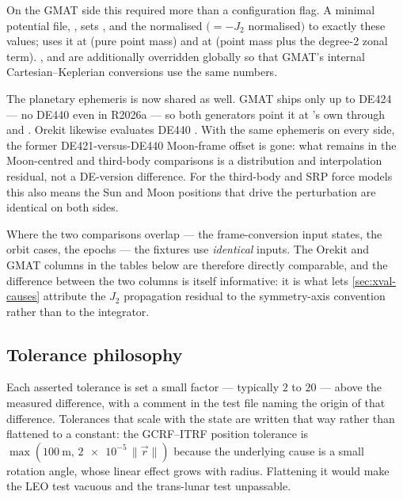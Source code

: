 On the GMAT side this required more than a configuration flag. A minimal
potential file, , sets ,
 and the normalised  $(= -J_2$ normalised$)$ to exactly
these values;  uses it at  (pure point
mass) and  at  (point mass plus the
degree-2 zonal term). ,  and
 are additionally overridden globally so that GMAT's internal
Cartesian--Keplerian conversions use the same numbers.

The planetary ephemeris is now shared as well. GMAT ships only up to DE424 ---
no DE440 even in R2026a --- so both generators point it at \lupnt{}'s own
 through  and
. Orekit likewise evaluates DE440
\citep{park2021de440}. With the same ephemeris on every side, the former
DE421-versus-DE440 Moon-frame offset is gone: what remains in the Moon-centred
and third-body comparisons is a distribution and interpolation residual, not a
DE-version difference. For the third-body and SRP force models this also means
the Sun and Moon positions that drive the perturbation are identical on both
sides.

Where the two comparisons overlap --- the frame-conversion input states, the
orbit cases, the epochs --- the fixtures use \emph{identical} inputs. The
Orekit and GMAT columns in the tables below are therefore directly comparable,
and the difference between the two columns is itself informative: it is what
lets \cref{sec:xval-causes} attribute the $J_2$ propagation residual to the
symmetry-axis convention rather than to the integrator.

\subsection{Tolerance philosophy}
\label{sec:xval-tolerances}

Each asserted tolerance is set a small factor --- typically $2$ to $20$ ---
above the measured difference, with a comment in the test file naming the
origin of that difference. Tolerances that scale with the state are written
that way rather than flattened to a constant: the GCRF--ITRF position
tolerance is $\max(\SI{100}{\meter},\, \num{2e-5}\,\lVert\vec r\rVert)$
because the underlying cause is a small rotation angle, whose linear effect
grows with radius. Flattening it would make the LEO test vacuous and the
trans-lunar test unpassable.

